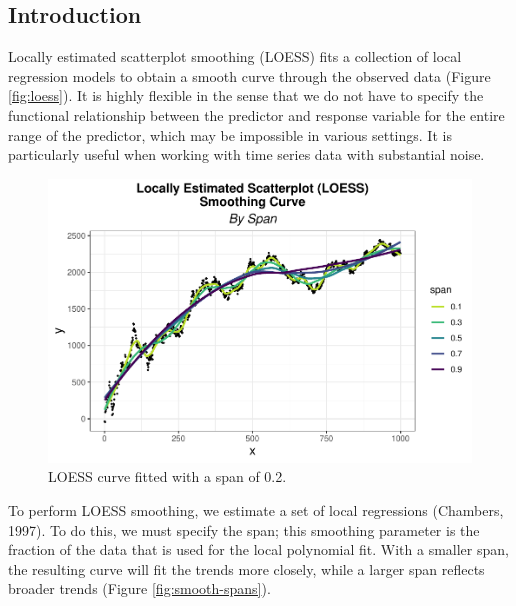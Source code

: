 \documentclass[12pt,twoside]{smiththesis}
\begin{document}
\hypertarget{introduction-1}{%
\subsection{Introduction}\label{introduction-1}}

Locally estimated scatterplot smoothing (LOESS) fits a collection of local regression models to obtain a smooth curve through the observed data (Figure \ref{fig:loess}). It is highly flexible in the sense that we do not have to specify the functional relationship between the predictor and response variable for the entire range of the predictor, which may be impossible in various settings. It is particularly useful when working with time series data with substantial noise.
\begin{figure}

{\centering \includegraphics[width=1\linewidth]{thesis_files/figure-latex/unnamed-chunk-30-1} 

}

\caption{\label{fig:loess}LOESS curve fitted with  a span of 0.2. }\label{fig:unnamed-chunk-30}
\end{figure}
To perform LOESS smoothing, we estimate a set of local regressions (Chambers, 1997). To do this, we must specify the span; this smoothing parameter is the fraction of the data that is used for the local polynomial fit. With a smaller span, the resulting curve will fit the trends more closely, while a larger span reflects broader trends (Figure \ref{fig:smooth-spans}).
\end{document}

